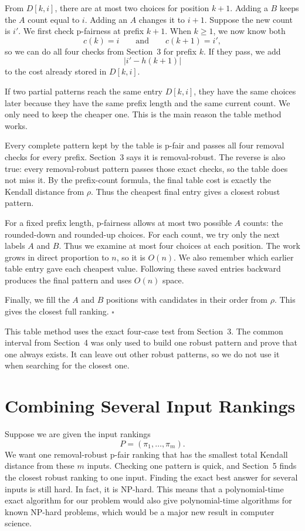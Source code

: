 \documentclass[11pt]{article}
\begin{document}
From $D[k,i]$, there are at most two choices for position $k+1$.  Adding a
$B$ keeps the $A$ count equal to $i$.  Adding an $A$ changes it to $i+1$.
Suppose the new count is $i'$.  We first check p-fairness at prefix $k+1$.
When $k\ge1$, we now know both
\[
 c(k)=i\qquad\text{and}\qquad c(k+1)=i',
\]
so we can do all four checks from Section~3 for prefix $k$.  If they pass, we
add
\[
 |i'-h(k+1)|
\]
to the cost already stored in $D[k,i]$.

If two partial patterns reach the same entry $D[k,i]$, they have the same
choices later because they have the same prefix length and the same current
count.  We only need to keep the cheaper one.  This is the main reason the
table method works.

Every complete pattern kept by the table is p-fair and passes all four
removal checks for every prefix.  Section~3 says it is removal-robust.  The
reverse is also true: every removal-robust pattern passes those exact checks,
so the table does not miss it.  By the prefix-count formula, the final table
cost is exactly the Kendall distance from $\rho$.  Thus the cheapest final
entry gives a closest robust pattern.

For a fixed prefix length, p-fairness allows at most two possible $A$ counts:
the rounded-down and rounded-up choices.  For each count, we try only the next
labels $A$ and $B$.  Thus we examine at most four choices at each position.
The work grows in direct proportion to $n$, so it is $O(n)$.  We also remember
which earlier table entry gave each cheapest value.  Following these saved
entries backward produces the final pattern and uses $O(n)$ space.

Finally, we fill the $A$ and $B$ positions with candidates in their order
from $\rho$.  This gives the closest full ranking. \hfill\(\square\)

This table method uses the exact four-case test from Section~3.  The common
interval from Section~4 was only used to build one robust pattern and prove
that one always exists.  It can leave out other robust patterns, so we do not
use it when searching for the closest one.

\section{Combining Several Input Rankings}

Suppose we are given the input rankings
\[
 P=(\pi_1,\ldots,\pi_m).
\]
We want one removal-robust p-fair ranking that has the smallest total Kendall
distance from these $m$ inputs.  Checking one pattern is quick, and Section~5
finds the closest robust ranking to one input.  Finding the exact best answer
for several inputs is still hard.  In fact, it is NP-hard.  This means that a
polynomial-time exact algorithm for our problem would also give
polynomial-time algorithms for known NP-hard problems, which would be a major
new result in computer science.
\end{document}
